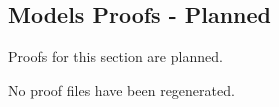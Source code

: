 \subsection*{Models Proofs - Planned}

\begin{remark*}
Proofs for this section are planned.
\end{remark*}

\begin{remark*}
No proof files have been regenerated.
\end{remark*}
